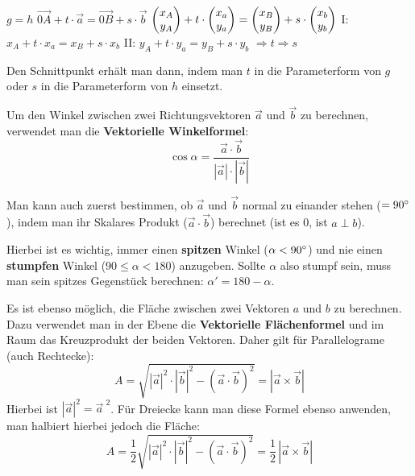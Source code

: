 \begin{itemize}
  \begin{center}
    $g = h$
    \extrapar
    $\vec{0A} + t \cdot \vec{a} = \vec{0B} + s \cdot \vec{b}$
    \extrapar
    $\begin{pmatrix}x_{A}\\y_{A}\end{pmatrix} + t \cdot \begin{pmatrix}x_{a}\\y_{a}\end{pmatrix} = \begin{pmatrix}x_{B}\\y_{B}\end{pmatrix} + s \cdot \begin{pmatrix}x_{b}\\y_{b}\end{pmatrix}$
    \extrapar
    I: $x_{A} + t \cdot x_{a} = x_{B} + s \cdot x_{b}$
    \extrapar
    II: $y_{A} + t \cdot y_{a} = y_{B} + s \cdot y_{b}$
    \extrapar
    $\Rightarrow t \Rightarrow s$
  \end{center}

  Den Schnittpunkt erh\"{a}lt man dann, indem man $t$ in die Parameterform von $g$ oder $s$ in die Parameterform von $h$ einsetzt.

\end{itemize}

\pagebreak


Um den Winkel zwischen zwei Richtungsvektoren $\vec{a}$ und $\vec{b}$ zu berechnen, verwendet man die \textbf{Vektorielle Winkelformel}:
$$ \cos \alpha = \frac{\vec{a} \cdot \vec{b}}{|\vec{a}| \cdot |\vec{b}|}$$

Man kann auch zuerst bestimmen, ob $\vec{a}$ und $\vec{b}$ normal zu einander stehen ($= 90\degree$), indem man ihr Skalares Produkt ($\vec{a} \cdot \vec{b}$) berechnet (ist es 0, ist $a \perp b$).

Hierbei ist es wichtig, immer einen \textbf{spitzen} Winkel ($\alpha < 90\degree$) und nie einen \textbf{stumpfen} Winkel ($90 \leq \alpha < 180$) anzugeben. Sollte $\alpha$ also stumpf sein, muss man sein spitzes Gegenst\"{u}ck berechnen: $\alpha{}' = 180 - \alpha$.


Es ist ebenso m\"{o}glich, die Fl\"{a}che zwischen zwei Vektoren $a$ und $b$ zu berechnen. Dazu verwendet man in der Ebene die \textbf{Vektorielle Fl\"{a}chenformel} und im Raum das Kreuzprodukt der beiden Vektoren. Daher gilt f\"{u}r Parallelograme (auch Rechtecke): $$ A = \sqrt{{|\vec{a}|}^2 \cdot {|\vec{b}|}^2 - {(\vec{a} \cdot \vec{b})}^2} = |\vec{a} \times \vec{b}| $$ Hierbei ist $|\vec{a}|^2 = \vec{a}^{\,\,2}$. F\"{u}r Dreiecke kann man diese Formel ebenso anwenden, man halbiert hierbei jedoch die Fl\"{a}che: $$A = \frac{1}{2}\sqrt{{|\vec{a}|}^2 \cdot {|\vec{b}|}^2 - {(\vec{a} \cdot \vec{b})}^2} = \frac{1}{2} \, |\vec{a} \times \vec{b}|$$

